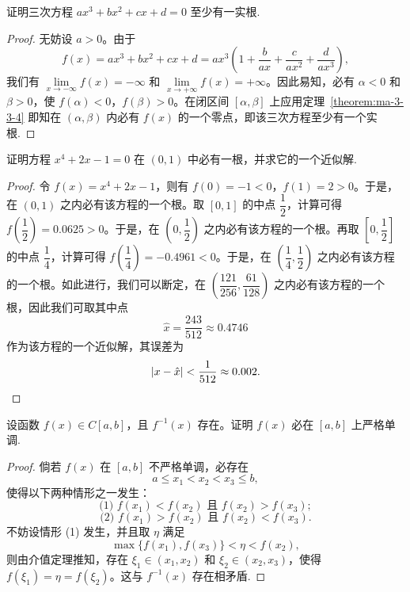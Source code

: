 \begin{example}\label{example:ma-3-3-4}
证明三次方程 $ax^3+bx^2+cx+d=0$ 至少有一实根.
\end{example}


\begin{proof}
无妨设 $a>0$。由于
\[
  f(x)=ax^3+bx^2+cx+d
  =
  ax^3\left(1+\frac b{ax}+\frac c{ax^2}+\frac d{ax^3}\right),
\]
我们有 $\lim\limits_{x\to-\infty}f(x)=-\infty$ 和 $\lim\limits_{x\to+\infty}f(x)=+\infty$。因此易知，必有 $\alpha<0$ 和 $\beta>0$，使 $f(\alpha)<0$，$f(\beta)>0$。在闭区间 $[\alpha,\beta]$ 上应用定理~\ref{theorem:ma-3-3-4} 即知在 $(\alpha,\beta)$ 内必有 $f(x)$ 的一个零点，即该三次方程至少有一个实根.
\end{proof}


\begin{example}\label{example:ma-3-3-5}
证明方程 $x^4+2x-1=0$ 在 $(0,1)$ 中必有一根，并求它的一个近似解.
\end{example}


\begin{proof}
令 $f(x)=x^4+2x-1$，则有 $f(0)=-1<0$，$f(1)=2>0$。于是，在 $(0,1)$ 之内必有该方程的一个根。取 $[0,1]$ 的中点 $\dfrac12$，计算可得 $f\left(\dfrac12\right)=0.0625>0$。于是，在 $\left(0,\dfrac12\right)$ 之内必有该方程的一个根。再取 $\left[0,\dfrac12\right]$ 的中点 $\dfrac14$，计算可得 $f\left(\dfrac14\right)=-0.4961<0$。于是，在 $\left(\dfrac14,\dfrac12\right)$ 之内必有该方程的一个根。如此进行，我们可以断定，在 $\left(\dfrac{121}{256},\dfrac{61}{128}\right)$ 之内必有该方程的一个根，因此我们可取其中点
\[
  \hat x=\frac{243}{512}\approx0.4746
\]
作为该方程的一个近似解，其误差为
\[
  |x-\hat x|<\frac1{512}\approx0.002.
\qedhere
\]
\end{proof}


\begin{example}\label{example:ma-3-3-6}
设函数 $f(x)\in C[a,b]$，且 $f^{-1}(x)$ 存在。证明 $f(x)$ 必在 $[a,b]$ 上严格单调.
\end{example}


\begin{proof}
倘若 $f(x)$ 在 $[a,b]$ 不严格单调，必存在
\[
  a\leqslant x_1<x_2<x_3\leqslant b,
\]
使得以下两种情形之一发生：
\[
  \text{(1) } f(x_1)<f(x_2)\text{ 且 }f(x_2)>f(x_3);
\]
\[
  \text{(2) } f(x_1)>f(x_2)\text{ 且 }f(x_2)<f(x_3).
\]
不妨设情形 (1) 发生，并且取 $\eta$ 满足
\[
  \max\{f(x_1),f(x_3)\}<\eta<f(x_2),
\]
则由介值定理推知，存在 $\xi_1\in(x_1,x_2)$ 和 $\xi_2\in(x_2,x_3)$，使得 $f(\xi_1)=\eta=f(\xi_2)$。这与 $f^{-1}(x)$ 存在相矛盾.
\end{proof}


